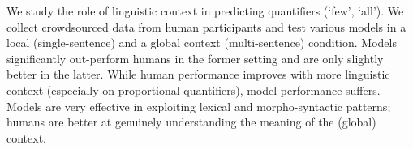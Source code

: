 We study the role of linguistic context in predicting quantifiers (‘few', ‘all'). We collect crowdsourced data from human participants and test various models in a local (single-sentence) and a global context (multi-sentence) condition. Models significantly out-perform humans in the former setting and are only slightly better in the latter. While human performance improves with more linguistic context (especially on proportional quantifiers), model performance suffers. Models are very effective in exploiting lexical and morpho-syntactic patterns; humans are better at genuinely understanding the meaning of the (global) context.
